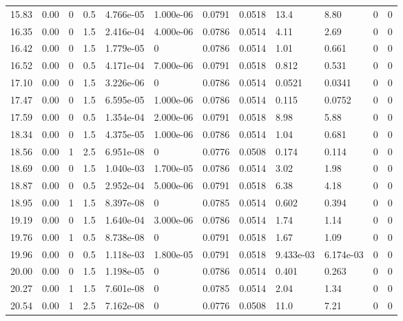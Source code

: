 \documentclass[preview]{standalone}
\begin{document}
{{{\begin{tabular}{L{1.2cm}C{1.2cm} C{0.3cm}C{0.5cm} C{1.4cm}C{1.4cm} C{1.4cm}C{1.4cm} C{1.6cm}C{1.6cm} C{1.6cm}C{1.6cm}}
  15.83  &  0.00  & 0     & 0.5 &  4.766e-05  & 1.000e-06  &  0.0791&   0.0518& 13.4 & 8.80   &  0 & 0  \\ 
  16.35  &  0.00  & 0     & 1.5 &  2.416e-04  & 4.000e-06  &  0.0786&   0.0514& 4.11 & 2.69   &  0 & 0  \\ 
  16.42  &  0.00  & 0     & 1.5 &  1.779e-05  & 0  &  0.0786&   0.0514& 1.01 & 0.661   &  0 & 0  \\ 
  16.52  &  0.00  & 0     & 0.5 &  4.171e-04  & 7.000e-06  &  0.0791&   0.0518& 0.812 & 0.531   &  0 & 0  \\ 
  17.10  &  0.00  & 0     & 1.5 &  3.226e-06  & 0  &  0.0786&   0.0514& 0.0521 & 0.0341   &  0 & 0  \\ 
  17.47  &  0.00  & 0     & 1.5 &  6.595e-05  & 1.000e-06  &  0.0786&   0.0514& 0.115 & 0.0752   &  0 & 0  \\ 
  17.59  &  0.00  & 0     & 0.5 &  1.354e-04  & 2.000e-06  &  0.0791&   0.0518& 8.98 & 5.88   &  0 & 0  \\ 
  18.34  &  0.00  & 0     & 1.5 &  4.375e-05  & 1.000e-06  &  0.0786&   0.0514& 1.04 & 0.681   &  0 & 0  \\ 
  18.56  &  0.00  & 1     & 2.5 &  6.951e-08  & 0  &  0.0776&   0.0508& 0.174 & 0.114   &  0 & 0  \\ 
  18.69  &  0.00  & 0     & 1.5 &  1.040e-03  & 1.700e-05  &  0.0786&   0.0514& 3.02 & 1.98   &  0 & 0  \\ 
  18.87  &  0.00  & 0     & 0.5 &  2.952e-04  & 5.000e-06  &  0.0791&   0.0518& 6.38 & 4.18   &  0 & 0  \\ 
  18.95  &  0.00  & 1     & 1.5 &  8.397e-08  & 0  &  0.0785&   0.0514& 0.602 & 0.394   &  0 & 0  \\ 
  19.19  &  0.00  & 0     & 1.5 &  1.640e-04  & 3.000e-06  &  0.0786&   0.0514& 1.74 & 1.14   &  0 & 0  \\ 
  19.76  &  0.00  & 1     & 0.5 &  8.738e-08  & 0  &  0.0791&   0.0518& 1.67 & 1.09   &  0 & 0  \\ 
  19.96  &  0.00  & 0     & 0.5 &  1.118e-03  & 1.800e-05  &  0.0791&   0.0518& 9.433e-03 & 6.174e-03   &  0 & 0  \\ 
  20.00  &  0.00  & 0     & 1.5 &  1.198e-05  & 0  &  0.0786&   0.0514& 0.401 & 0.263   &  0 & 0  \\ 
  20.27  &  0.00  & 1     & 1.5 &  7.601e-08  & 0  &  0.0785&   0.0514& 2.04 & 1.34   &  0 & 0  \\ 
  20.54  &  0.00  & 1     & 2.5 &  7.162e-08  & 0  &  0.0776&   0.0508& 11.0 & 7.21   &  0 & 0  \\ 

\end{tabular}}}}
\end{document}
